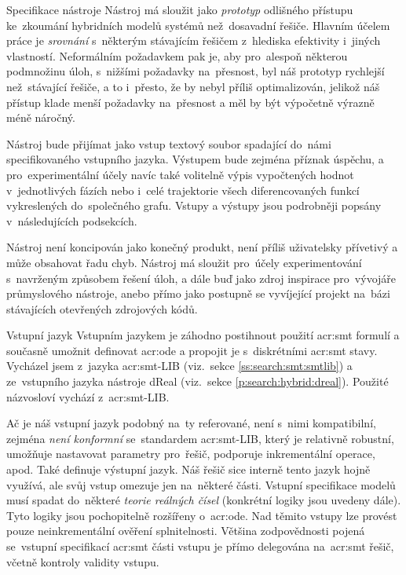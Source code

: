\documentclass[thesis=M,czech]{FITthesis}[2012/06/26]
\newcommand{\acrlabel}[1]{acr:#1}
\newcommand{\acr}[1]{\acrshort{\acrlabel{#1}}}
\newcommand{\hl}[1]{\textit{#1}}
\newcommand{\rf}[1]{\ref{#1}}
\begin{document}

\begin{section}{Specifikace nástroje}\label{s:design:spec}
Nástroj má sloužit jako \hl{prototyp}
odlišného přístupu ke~zkoumání hybridních modelů systémů
než~dosavadní řešiče.
Hlavním účelem práce je \hl{srovnání}
s~některým stávajícím řešičem
z~hlediska efektivity
i~jiných vlastností.
Neformálním požadavkem pak je,
aby pro~alespoň některou podmnožinu
úloh, s~nižšími požadavky na~přesnost, byl náš prototyp
rychlejší než~stávající řešiče,
a to i~přesto, že by nebyl příliš optimalizován,
jelikož náš přístup
klade menší požadavky na~přesnost
a měl by být výpočetně výrazně méně náročný.

Nástroj bude přijímat jako vstup textový soubor
spadající do~námi specifikovaného vstupního jazyka.
Výstupem bude zejména příznak úspěchu,
a pro~experimentální účely navíc také
volitelně výpis vypočtených hodnot
v~jednotlivých fázích
nebo i~celé trajektorie všech
diferencovaných funkcí vykreslených do~společného grafu.
Vstupy a výstupy jsou podrobněji popsány v~následujících podsekcích.

Nástroj není koncipován jako konečný produkt,
není příliš uživatelsky přívetivý
a může obsahovat řadu chyb.
Nástroj má sloužit pro~účely experimentování
s~navrženým způsobem řešení úloh,
a dále buď jako zdroj inspirace
pro~vývojáře průmyslového nástroje,
anebo přímo jako postupně se vyvíjející projekt
na~bázi stávajících otevřených zdrojových kódů.


\begin{subsection}{Vstupní jazyk}\label{ss:design:spec:ilang}
Vstupním jazykem je záhodno postihnout
použití \acr{smt} formulí
a současně umožnit definovat \acr{ode}
a propojit je s~diskrétními \acr{smt} stavy.
Vycházel jsem z~jazyka \acr{smt}-LIB
(viz.~sekce \rf{ss:search:smt:smtlib})
a ze~vstupního jazyka nástroje dReal
(viz.~sekce \rf{p:search:hybrid:dreal}).
Použité názvosloví vychází z~\acr{smt}-LIB.

Ač je náš vstupní jazyk podobný na~ty referované,
není s~nimi kompatibilní,
zejména \hl{není konformní} se~standardem \acr{smt}-LIB,
který je relativně robustní,
umožňuje nastavovat parametry pro~řešič,
podporuje inkrementální operace, apod.
Také definuje výstupní jazyk.
Náš řešič sice interně tento jazyk hojně využívá,
ale svůj vstup omezuje jen na~některé části.
Vstupní specifikace modelů musí
spadat do~některé \hl{teorie reálných čísel}
(konkrétní logiky jsou uvedeny dále).
Tyto logiky jsou pochopitelně rozšířeny o~\acr{ode}.
Nad těmito vstupy lze provést pouze neinkrementální ověření splnitelnosti.
Většina zodpovědnosti pojená se~vstupní specifikací
\acr{smt} části vstupu je přímo delegována
na~\acr{smt} řešič, včetně kontroly validity vstupu.


\end{subsection}
\end{section}
\end{document}
